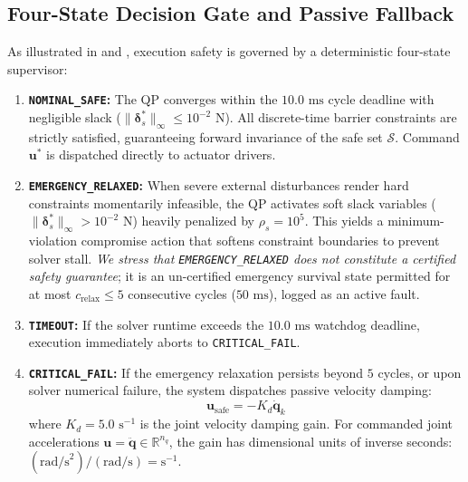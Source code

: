 \subsection{Four-State Decision Gate and Passive Fallback}
As illustrated in  and , execution safety is governed by a deterministic four-state supervisor:
\begin{enumerate}
    \item \textbf{\texttt{NOMINAL\_SAFE}:} The QP converges within the $10.0\text{ ms}$ cycle deadline with negligible slack ($\|\boldsymbol{\delta}_s^*\|_\infty \le 10^{-2}\text{ N}$). All discrete-time barrier constraints are strictly satisfied, guaranteeing forward invariance of the safe set $\mathcal{S}$. Command $\mathbf{u}^*$ is dispatched directly to actuator drivers.
    \item \textbf{\texttt{EMERGENCY\_RELAXED}:} When severe external disturbances render hard constraints momentarily infeasible, the QP activates soft slack variables ($\|\boldsymbol{\delta}_s^*\|_\infty > 10^{-2}\text{ N}$) heavily penalized by $\rho_s = 10^5$. This yields a minimum-violation compromise action that softens constraint boundaries to prevent solver stall. \emph{We stress that \texttt{EMERGENCY\_RELAXED} does not constitute a certified safety guarantee}; it is an un-certified emergency survival state permitted for at most $c_{\text{relax}} \le 5$ consecutive cycles ($50\text{ ms}$), logged as an active fault.
    \item \textbf{\texttt{TIMEOUT}:} If the solver runtime exceeds the $10.0\text{ ms}$ watchdog deadline, execution immediately aborts to \texttt{CRITICAL\_FAIL}.
    \item \textbf{\texttt{CRITICAL\_FAIL}:} If the emergency relaxation persists beyond $5$ cycles, or upon solver numerical failure, the system dispatches passive velocity damping:
    \begin{equation}
        \mathbf{u}_{\text{safe}} = -K_d \dot{\mathbf{q}}_k
        \label{eq:passive_damping}
    \end{equation}
    where $K_d = 5.0\text{ s}^{-1}$ is the joint velocity damping gain. For commanded joint accelerations $\mathbf{u} = \ddot{\mathbf{q}} \in \mathbb{R}^{n_q}$, the gain has dimensional units of inverse seconds: $(\text{rad/s}^2) / (\text{rad/s}) = \text{s}^{-1}$. 
\end{enumerate}

